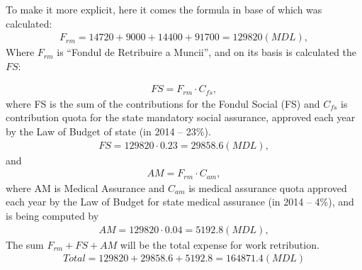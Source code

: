 To make it more explicit, here it comes the formula in base of which was calculated:
\begin{eqnarray}
F_{rm} = 14720 + 9000 + 14400 + 91700 = 129820 (MDL) , \label{PayOff}
\end{eqnarray}
Where \(F_{rm}\) is “Fondul de Retribuire a Muncii”, and on its basis is calculated the \(FS\):

\begin{eqnarray}
FS =  F_{rm} \cdot C_{fs} , \label{FondulSocial}
\end{eqnarray}
where FS is the sum of the contributions for the Fondul Social (FS) and
\(C_{fs}\) is contribution quota for the state mandatory social assurance,
approved each year by the Law of Budget of state (in 2014 – 23\%).
\begin{eqnarray}
FS = 129820 \cdot 0.23 = 29858.6 (MDL),
\end{eqnarray}
and
\begin{eqnarray}
AM = F_{rm} \cdot C_{am},
\end{eqnarray}
where AM is Medical Assurance and \(C_{am}\) is medical assurance quota approved
each year by the Law of Budget for state medical assurance (in 2014 – 4\%), and
is being computed by
\begin{eqnarray}
AM = 129820 \cdot 0.04 = 5192.8 (MDL) ,
\end{eqnarray}
The sum \(F_{rm} + FS +AM\) will be the total expense for work retribution.
\begin{eqnarray}
Total = 129820 + 29858.6 + 5192.8 = 164871.4 (MDL)
\end{eqnarray}

